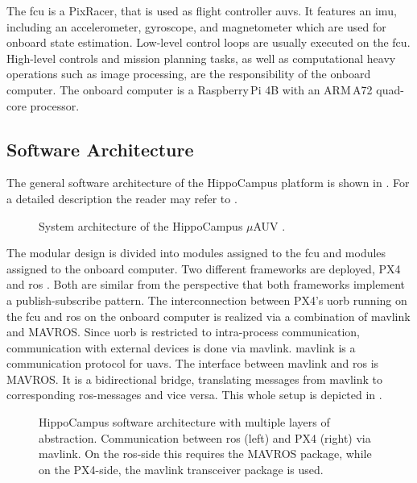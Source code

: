 The \ac{fcu} is a PixRacer, that is used as flight controller \acp{auv}. It features an \ac{imu}, including an accelerometer, gyroscope, and magnetometer which are used for onboard state estimation. Low-level control loops are usually executed on the \ac{fcu}. High-level controls and mission planning tasks, as well as computational heavy operations such as image processing, are the responsibility of the onboard computer. The onboard computer is a Raspberry\,Pi 4B with an ARM\,A72 quad-core processor.

\subsection{Software Architecture}
The general software architecture of the HippoCampus platform is shown in . 
For a detailed description the reader may refer to \cite{duecker-phd}. 
\begin{figure}[h!]
	\centering
     \def\svgwidth{12cm}  
	
	\caption{System architecture of the HippoCampus $\mu$AUV \cite{duecker-phd}.}
    \label{fig:software-architecture-overview}
\end{figure}
The modular design is divided into modules assigned to the \ac{fcu} and modules assigned to the onboard computer.
Two different frameworks are deployed, PX4 \cite{PX4} and \ac{ros} \cite{ros}.
Both are similar from the perspective that both frameworks implement a publish-subscribe pattern.
The interconnection between PX4's \ac{uorb} running on the \ac{fcu} and \ac{ros} on the onboard computer is realized via a combination of \ac{mavlink} \cite{mavlink} and MAVROS.
Since \ac{uorb} is restricted to intra-process communication, communication with external devices is done via \ac{mavlink}.
\ac{mavlink} is a communication protocol for \acp{uav}.
The interface between \ac{mavlink} and \ac{ros} is MAVROS. It is a bidirectional bridge, translating messages from \ac{mavlink} to corresponding \acs{ros}-messages and vice versa. This whole setup is depicted in .
\begin{figure}[h!]
	\centering
	
	\caption{HippoCampus software architecture with multiple layers of abstraction. Communication between \acs{ros} (left) and PX4 (right) via \acs{mavlink}. On the \acs{ros}-side this requires the MAVROS package, while on the PX4-side, the \acs{mavlink} transceiver package is used.}
    \label{fig:ros-px4-communication}
\end{figure}


